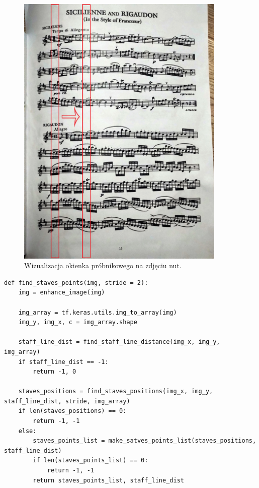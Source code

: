 \begin{figure}
	\centering
	\includegraphics[width=10cm]{images/probe_window_demo.jpg}
	\caption{Wizualizacja okienka próbnikowego na zdjęciu nut.}
	\label{fig:probe_window_demo}
\end{figure}

\begin{lstlisting}
def find_staves_points(img, stride = 2):
	img = enhance_image(img)
	
	img_array = tf.keras.utils.img_to_array(img)
	img_y, img_x, c = img_array.shape
	
	staff_line_dist = find_staff_line_distance(img_x, img_y, img_array)
	if staff_line_dist == -1:
		return -1, 0
	
	staves_positions = find_staves_positions(img_x, img_y, staff_line_dist, stride, img_array)
	if len(staves_positions) == 0:
		return -1, -1
	else:
		staves_points_list = make_satves_points_list(staves_positions, staff_line_dist)
		if len(staves_points_list) == 0:
			return -1, -1
		return staves_points_list, staff_line_dist
\end{lstlisting}

